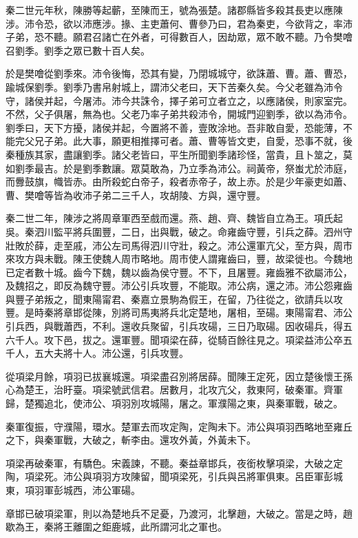 秦二世元年秋，陳勝等起蘄，至陳而王，號為張楚。諸郡縣皆多殺其長吏以應陳涉。沛令恐，欲以沛應涉。掾、主吏蕭何、曹參乃曰，君為秦吏，今欲背之，率沛子弟，恐不聽。願君召諸亡在外者，可得數百人，因劫眾，眾不敢不聽。乃令樊噲召劉季。劉季之眾已數十百人矣。

於是樊噲從劉季來。沛令後悔，恐其有變，乃閉城城守，欲誅蕭、曹。蕭、曹恐，踰城保劉季。劉季乃書帛射城上，謂沛父老曰，天下苦秦久矣。今父老雖為沛令守，諸侯并起，今屠沛。沛今共誅令，擇子弟可立者立之，以應諸侯，則家室完。不然，父子俱屠，無為也。父老乃率子弟共殺沛令，開城門迎劉季，欲以為沛令。劉季曰，天下方擾，諸侯并起，今置將不善，壹敗涂地。吾非敢自愛，恐能薄，不能完父兄子弟。此大事，願更相推擇可者。蕭、曹等皆文吏，自愛，恐事不就，後秦種族其家，盡讓劉季。諸父老皆曰，平生所聞劉季諸珍怪，當貴，且卜筮之，莫如劉季最吉。於是劉季數讓。眾莫敢為，乃立季為沛公。祠黃帝，祭蚩尤於沛庭，而釁鼓旗，幟皆赤。由所殺蛇白帝子，殺者赤帝子，故上赤。於是少年豪吏如蕭、曹、樊噲等皆為收沛子弟二三千人，攻胡陵、方與，還守豐。

秦二世二年，陳涉之將周章軍西至戲而還。燕、趙、齊、魏皆自立為王。項氏起吳。秦泗川監平將兵圍豐，二日，出與戰，破之。命雍齒守豐，引兵之薛。泗州守壯敗於薛，走至戚，沛公左司馬得泗川守壯，殺之。沛公還軍亢父，至方與，周市來攻方與未戰。陳王使魏人周市略地。周市使人謂雍齒曰，豐，故梁徙也。今魏地已定者數十城。齒今下魏，魏以齒為侯守豐。不下，且屠豐。雍齒雅不欲屬沛公，及魏招之，即反為魏守豐。沛公引兵攻豐，不能取。沛公病，還之沛。沛公怨雍齒與豐子弟叛之，聞東陽甯君、秦嘉立景駒為假王，在留，乃往從之，欲請兵以攻豐。是時秦將章邯從陳，別將司馬夷將兵北定楚地，屠相，至碭。東陽甯君、沛公引兵西，與戰蕭西，不利。還收兵聚留，引兵攻碭，三日乃取碭。因收碭兵，得五六千人。攻下邑，拔之。還軍豐。聞項梁在薛，從騎百餘往見之。項梁益沛公卒五千人，五大夫將十人。沛公還，引兵攻豐。

從項梁月餘，項羽已拔襄城還。項梁盡召別將居薛。聞陳王定死，因立楚後懷王孫心為楚王，治盱臺。項梁號武信君。居數月，北攻亢父，救東阿，破秦軍。齊軍歸，楚獨追北，使沛公、項羽別攻城陽，屠之。軍濮陽之東，與秦軍戰，破之。

秦軍復振，守濮陽，環水。楚軍去而攻定陶，定陶未下。沛公與項羽西略地至雍丘之下，與秦軍戰，大破之，斬李由。還攻外黃，外黃未下。

項梁再破秦軍，有驕色。宋義諫，不聽。秦益章邯兵，夜銜枚擊項梁，大破之定陶，項梁死。沛公與項羽方攻陳留，聞項梁死，引兵與呂將軍俱東。呂臣軍彭城東，項羽軍彭城西，沛公軍碭。

章邯已破項梁軍，則以為楚地兵不足憂，乃渡河，北擊趙，大破之。當是之時，趙歇為王，秦將王離圍之鉅鹿城，此所謂河北之軍也。

